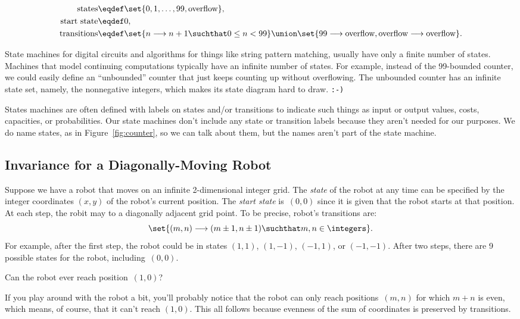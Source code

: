 \begin{align*}
\text{states} &  \eqdef \set{0, 1,\dots,99, \text{overflow}},\\
\text{start state}  & \eqdef 0,\\
\text{transitions} & \eqdef \set{n \movesto n+1 \suchthat 0 \le n < 99}
                     \union \set{99 \movesto \text{overflow},
                                 \text{overflow} \movesto \text{overflow}}.
\end{align*}

State machines for digital circuits and algorithms for things like
string pattern matching, usually have only a finite number of states.
Machines that model continuing computations typically have an infinite
number of states.  For example, instead of the 99-bounded counter, we
could easily define an ``unbounded'' counter that just keeps counting
up without overflowing.  The unbounded counter has an infinite state
set, namely, the nonnegative integers, which makes its state diagram
hard to draw. \texttt{:-)}

States machines are often defined with labels on states and/or
transitions to indicate such things as input or output values, costs,
capacities, or probabilities.  Our state machines don't include any
state or transition labels because they aren't needed for our
purposes.  We do name states, as in Figure~\ref{fig:counter}, so we
can talk about them, but the names aren't part of the state machine.

\subsection{Invariance for a Diagonally-Moving Robot}
Suppose we have a robot that moves on an infinite 2-dimensional
integer grid.  The \emph{state} of the robot at any time can be
specified by the integer coordinates $(x, y)$ of the robot's current
position.  The \emph{start state} is~$(0, 0)$ since it is given that
the robot starts at that position.  At each step, the robit may to a
diagonally adjacent grid point.  To be precise, robot's transitions
are:
\[
\set{(m,n)\movesto (m\pm 1, n\pm 1) \suchthat m,n \in \integers}.
\]
For example, after the first step, the robot could be in states $(1,
1)$, $(1, -1)$, $(-1, 1)$, or $(-1, -1)$.  After two steps, there are
9 possible states for the robot, including~$(0, 0)$.

Can the robot ever reach position~$(1, 0)$?

If you play around with the robot a bit, you'll probably notice that
the robot can only reach positions~$(m, n)$ for which $m + n$ is even,
which means, of course, that it can't reach $(1,0)$.  This all follows
because evenness of the sum of coordinates is preserved by
transitions.

